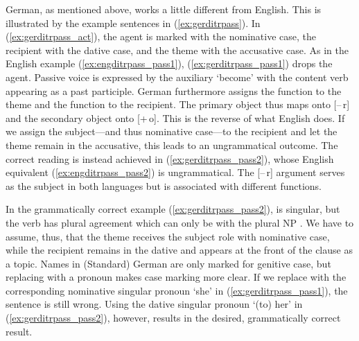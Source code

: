 German, as mentioned above, works a little different from English. This is
illustrated by the example sentences in (\ref{ex:gerditrpass}). In
(\ref{ex:gerditrpass_act}), the agent is marked with the nominative case, the
recipient with the dative case, and the theme with the accusative case. As in
the English example (\ref{ex:engditrpass_pass1}),
(\ref{ex:gerditrpass_pass1}) drops the agent. Passive voice is expressed by the
auxiliary  `become' with the content verb appearing as a past
participle. German furthermore assigns the \Obj{} function to the theme and the
\SObj{} function to the recipient. The primary object thus maps onto [–\,r] and
the secondary object onto [+\,o]. This is the reverse of what English does. If
we assign the subject---and thus nominative case---to the recipient and let the
theme remain in the accusative, this leads to an ungrammatical outcome. The
correct reading is instead achieved in (\ref{ex:gerditrpass_pass2}), whose
English equivalent (\ref{ex:engditrpass_pass2}) is ungrammatical. The [–\,r]
argument serves as the subject in both languages but is associated with
different functions.

In the grammatically correct example (\ref{ex:gerditrpass_pass2}),  is
singular, but the verb  has plural agreement which can only be with
the plural NP . We have to assume, thus, that the theme
receives the subject role with nominative case, while the recipient remains in
the dative and appears at the front of the clause as a topic. Names in
(Standard) German are only marked for genitive case, but replacing 
with a pronoun makes case marking more clear. If we replace  with the
corresponding nominative singular pronoun  `she' in
(\ref{ex:gerditrpass_pass1}), the sentence is still wrong. Using the dative
singular pronoun  `(to) her' in (\ref{ex:gerditrpass_pass2}), however,
results in the desired, grammatically correct result.

